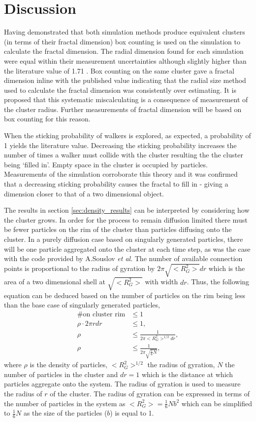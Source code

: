 \documentclass[%
 aapm,
 mph,%
 amsmath,amssymb,
 reprint,%
]{revtex4-2}
\begin{document}
\section{\label{sec:disscussion}Discussion}
Having demonstrated that both simulation methods produce equivalent clusters (in terms of their fractal dimension) box counting is used on the simulation to calculate the fractal dimension. The radial dimension found for each simulation were equal within their measurement uncertainties although slightly higher than the literature value of 1.71 \cite{MeakinDLA}. Box counting on the same cluster gave a fractal dimension inline with the published value indicating that the radial size method used to calculate the fractal dimension was consistently over estimating. It is proposed that this systematic miscalculating is a consequence of measurement of the cluster radius. Further measurements of fractal dimension will be based on box counting for this reason.

When the sticking probability of walkers is explored, as expected, a probability of 1 yields the literature value. Decreasing the sticking probability increases the number of times a walker must collide with the cluster resulting the the cluster being `filled in'. Empty space in the cluster is occupied by particles. Measurements of the simulation corroborate this theory and it was confirmed that a decreasing sticking probability causes the fractal to fill in - giving a dimension closer to that of a two dimensional object.

The results in section \ref{sec:density_results} can be interpreted by considering how the cluster grows. In order for the process to remain diffusion limited there must be fewer particles on the rim of the cluster than particles diffusing onto the cluster. In a purely diffusion case based on singularly generated particles, there will be one particle aggregated onto the cluster at each time step, as was the case with the code provided by A.Souslov \textit{et al}. 
The number of available connection points is proportional to the radius of gyration \cite{FractalsBook} by $2\pi \sqrt{<R_G^2>} dr$ which is the area of a two dimensional shell at $\sqrt{<R_G^2>}$ with width $dr$. 
Thus, the following equation can be deduced based on the number of particles on the rim being less than the base case of singularly generated particles,
\begin{align}
\textrm{\# on cluster rim}&\leq 1\nonumber\\
\rho\cdot2\pi r dr &\leq 1,\nonumber\\
\rho &\leq \frac{1}{2\pi <R_G^2>^{1/2} dr},\nonumber\\
\rho &\leq \frac{1}{2\pi \sqrt{\frac{1}{6}N}},
\label{eq:dla_limit}
\end{align}
where $\rho$ is the density of particles, $<R_G^2>^{1/2}$ the radius of gyration, $N$ the number of particles in the cluster and $dr=1$ which is the distance at which particles aggregate onto the system.  The radius of gyration is used to measure the radius of $r$ of the cluster. The radius of gyration can be expressed in terms of the number of particles in the system as $<R_G^2>=\frac{1}{6}Nb^2$ which can be simplified to $\frac{1}{6}N$ as the size of the particles ($b$) is equal to 1.
\end{document}
